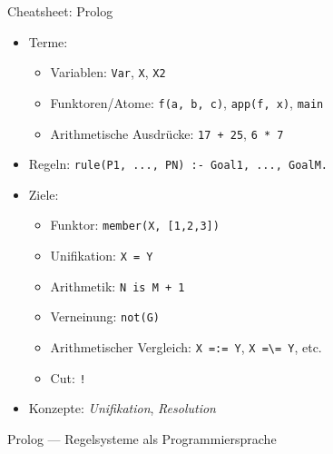 \documentclass{beamer}
\begin{document}
\begin{frame}{Cheatsheet: Prolog}
  \begin{itemize}
    \item Terme:
    \begin{itemize}
      \item Variablen: \texttt{Var}, \texttt{X}, \texttt{X2}
      \item Funktoren/Atome: \texttt{f(a, b, c)}, \texttt{app(f, x)}, \texttt{main}
      \item Arithmetische Ausdrücke: \texttt{17 + 25}, \texttt{6 * 7}
    \end{itemize}
    \item Regeln: \texttt{rule(P1, ..., PN) :- Goal1, ..., GoalM.}
    \item Ziele:
    \begin{itemize}
      \item Funktor: \texttt{member(X, [1,2,3])}
      \item Unifikation: \texttt{X = Y}
      \item Arithmetik: \texttt{N is M + 1}
      \item Verneinung: \texttt{not(G)}
      \item Arithmetischer Vergleich: \texttt{X =:= Y}, \texttt{X =\textbackslash= Y}, etc.
      \item Cut: \texttt{!}
    \end{itemize}
    \item Konzepte: \emph{Unifikation}, \emph{Resolution}
  \end{itemize}
\end{frame}

\begin{frame}{Prolog --- Regelsysteme als Programmiersprache}

  \vfill


\end{frame}
\end{document}
